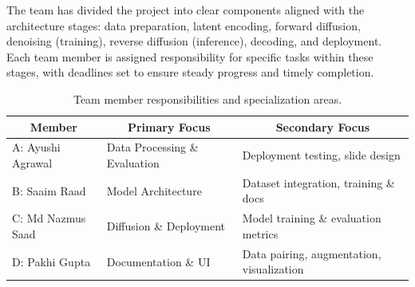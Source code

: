\documentclass{article} %
\begin{document}
The team has divided the project into clear components aligned with the architecture stages: data preparation, latent encoding, forward diffusion, denoising (training), reverse diffusion (inference), decoding, and deployment. Each team member is assigned responsibility for specific tasks within these stages, with deadlines set to ensure steady progress and timely completion. 

\begin{table}[h]
\caption{Team member responsibilities and specialization areas.}
\label{team-table}
\begin{center}
\begin{tabular}{lll}
\toprule
\multicolumn{1}{c}{\bf Member} &
\multicolumn{1}{c}{\bf Primary Focus} &
\multicolumn{1}{c}{\bf Secondary Focus} \\
\midrule
A: Ayushi Agrawal   & Data Processing \& Evaluation     & Deployment testing, slide design \\
\addlinespace
B: Saaim Raad       & Model Architecture                & Dataset integration, training \& docs \\
\addlinespace
C: Md Nazmus Saad   & Diffusion \& Deployment           & Model training \& evaluation metrics \\
\addlinespace
D: Pakhi Gupta      & Documentation \& UI               & Data pairing, augmentation, visualization \\
\bottomrule
\end{tabular}
\end{center}
\end{table}
\end{document}
